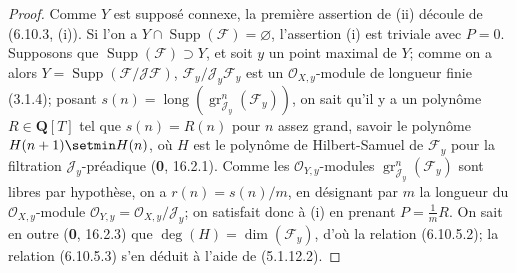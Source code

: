 \begin{proof}
Comme $Y$ est supposé connexe, la première assertion de (ii) découle de
(6.10.3, (i)). Si l'on a
$Y\cap\operatorname{Supp}(\mathcal F)=\varnothing$, l'assertion (i) est
triviale avec $P=0$. Supposons que
$\operatorname{Supp}(\mathcal F)\supset Y$, et soit $y$ un point maximal de
$Y$; comme on a alors $Y=\operatorname{Supp}(\mathcal F/\mathcal J\mathcal F)$,
$\mathcal F_y/\mathcal J_y\mathcal F_y$ est un
$\mathcal O_{X,y}$-module de longueur finie (3.1.4); posant
$s(n)=\operatorname{long}(\operatorname{gr}_{\mathcal J_y}^{n}(\mathcal F_y))$,
on sait qu'il y a un polynôme $R\in\mathbf Q[T]$ tel que $s(n)=R(n)$ pour
$n$ assez grand, savoir le polynôme $H(n+1)\setmin H(n)$, où $H$ est le polynôme
de Hilbert-Samuel de $\mathcal F_y$ pour la filtration
$\mathcal J_y$-préadique (\textbf{0}, 16.2.1). Comme les
$\mathcal O_{Y,y}$-modules
$\operatorname{gr}_{\mathcal J_y}^{n}(\mathcal F_y)$ sont libres par
hypothèse, on a $r(n)=s(n)/m$, en désignant par $m$ la longueur du
$\mathcal O_{X,y}$-module $\mathcal O_{Y,y}=\mathcal O_{X,y}/\mathcal J_y$; on satisfait donc
à (i) en
prenant $P=\frac{1}{m}R$. On sait en outre (\textbf{0}, 16.2.3) que
$\deg(H)=\dim(\mathcal F_y)$, d'où la relation (6.10.5.2); la relation
(6.10.5.3) s'en déduit à l'aide de (5.1.12.2).


\end{proof}
